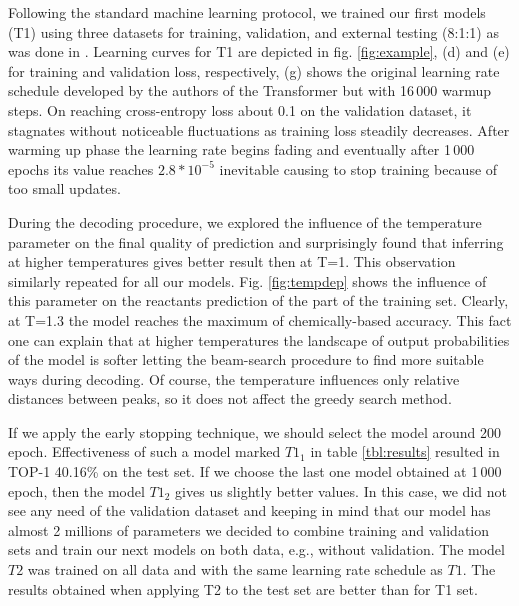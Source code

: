 \documentclass{article}
\begin{document}
Following the standard machine learning protocol, we trained our first models (T1) using three datasets for training, validation, and external testing (8:1:1) as was done in \cite{Pande}. Learning curves for T1 are depicted in fig. \ref{fig:example}, (d) and (e) for training and validation loss, respectively, (g) shows the original learning rate schedule developed by the authors of the Transformer but with 16\,000 warmup steps. On reaching cross-entropy loss about 0.1 on the validation dataset, it stagnates without noticeable fluctuations as training loss steadily decreases. After warming up phase the learning rate begins fading and eventually after 1\,000 epochs its value reaches $2.8*10^{-5}$ inevitable causing to stop training because of too small updates. 

During the decoding procedure, we explored the influence of the temperature parameter on the final quality of prediction and surprisingly found that inferring at higher temperatures gives better result then at T=1. This observation similarly repeated for all our models. Fig. \ref{fig:tempdep} shows the influence of this parameter on the reactants prediction of the part of the training set. Clearly, at T=1.3 the model reaches the maximum of chemically-based accuracy. This fact one can explain that at higher temperatures the landscape of output probabilities of the model is softer letting the beam-search procedure to find more suitable ways during decoding. Of course, the temperature influences only relative distances between peaks, so it does not affect the greedy search method. 

If we apply the early stopping technique, we should select the model around 200 epoch. Effectiveness of such a model marked $T1_1$ in table \ref{tbl:results} resulted in TOP-1 40.16\% on the test set. If we choose the last one model obtained at 1\,000 epoch, then the model $T1_2$ gives us slightly better values. In this case, we did not see any need of the validation dataset and keeping in mind that our model has almost 2 millions of parameters we decided to combine training and validation sets and train our next models on both data, e.g., without validation. The model $T2$ was trained on all data and with the same learning rate schedule as $T1$. The results obtained when applying T2 to the test set are better than for T1 set.
\end{document}

